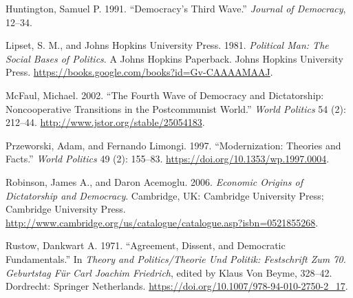 \documentclass[12pt,]{article}
\begin{document}
\leavevmode\hypertarget{ref-huntington}{}%
Huntington, Samuel P. 1991. ``Democracy's Third Wave.'' \emph{Journal of
Democracy}, 12--34.

\leavevmode\hypertarget{ref-lipset}{}%
Lipset, S. M., and Johns Hopkins University Press. 1981. \emph{Political
Man: The Social Bases of Politics}. A Johns Hopkins Paperback. Johns
Hopkins University Press.
\url{https://books.google.com/books?id=Gv-CAAAAMAAJ}.

\leavevmode\hypertarget{ref-mcfaul}{}%
McFaul, Michael. 2002. ``The Fourth Wave of Democracy and Dictatorship:
Noncooperative Transitions in the Postcommunist World.'' \emph{World
Politics} 54 (2): 212--44. \url{http://www.jstor.org/stable/25054183}.

\leavevmode\hypertarget{ref-przeworski}{}%
Przeworski, Adam, and Fernando Limongi. 1997. ``Modernization: Theories
and Facts.'' \emph{World Politics} 49 (2): 155--83.
\url{https://doi.org/10.1353/wp.1997.0004}.

\leavevmode\hypertarget{ref-robinson}{}%
Robinson, James A., and Daron Acemoglu. 2006. \emph{Economic Origins of
Dictatorship and Democracy}. Cambridge, UK: Cambridge University Press;
Cambridge University Press.
\url{http://www.cambridge.org/us/catalogue/catalogue.asp?isbn=0521855268}.

\leavevmode\hypertarget{ref-rustow}{}%
Rustow, Dankwart A. 1971. ``Agreement, Dissent, and Democratic
Fundamentals.'' In \emph{Theory and Politics/Theorie Und Politik:
Festschrift Zum 70. Geburtstag Für Carl Joachim Friedrich}, edited by
Klaus Von Beyme, 328--42. Dordrecht: Springer Netherlands.
\url{https://doi.org/10.1007/978-94-010-2750-2_17}.





\newpage
\singlespacing 
\end{document}
